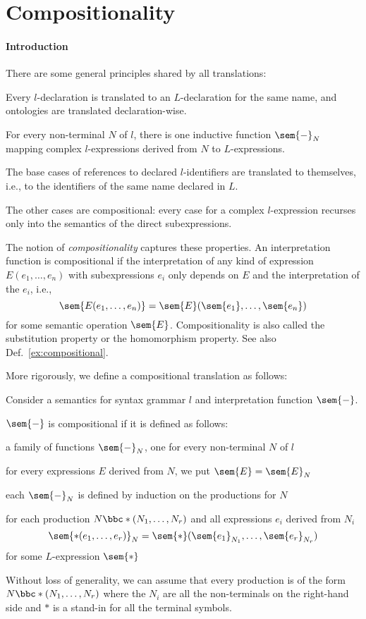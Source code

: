 \section{Compositionality}

\paragraph{Introduction}
There are some general principles shared by all translations:
\begin{compactitem}
 \item Every $l$-declaration is translated to an $L$-declaration for the same name, and ontologies are translated declaration-wise.
 \item For every non-terminal $N$ of $l$, there is one inductive function $\sem{-}_N$ mapping complex $l$-expressions derived from $N$ to $L$-expressions.
 \item The base cases of references to declared $l$-identifiers are translated to themselves, i.e., to the identifiers of the same name declared in $L$.
 \item The other cases are compositional: every case for a complex $l$-expression recurses only into the semantics of the direct subexpressions.
\end{compactitem}

The notion of \emph{compositionality} captures these properties.
An interpretation function is compositional if the interpretation of any kind of expression $E(e_1,\ldots,e_n)$ with subexpressions $e_i$ only depends on $E$ and the interpretation of the $e_i$, i.e., \[\sem{E(e_1,\ldots,e_n)}=\sem{E}(\sem{e_1},\ldots,\sem{e_n})\] for some semantic operation $\sem{E}$.
Compositionality is also called the substitution property or the homomorphism property.
See also Def.~\ref{ex:compositional}.

More rigorously, we define a compositional translation as follows:
\begin{definition}
Consider a semantics for syntax grammar $l$ and interpretation function $\sem{-}$.

$\sem{-}$ is compositional if it is defined as follows:
\begin{compactitem}
 \item a family of functions $\sem{-}_N$, one for every non-terminal $N$ of $l$
 \item for every expressions $E$ derived from $N$, we put $\sem{E}=\sem{E}_N$
 \item each $\sem{-}_N$ is defined by induction on the productions for $N$
 \item for each production $N\bbc *(N_1,\ldots,N_r)$ and all expressions $e_i$ derived from $N_i$
   \[\sem{*(e_1,\ldots,e_r)}_N=\sem{*}(\sem{e_1}_{N_1},\ldots,\sem{e_r}_{N_r})\]
   for some $L$-expression $\sem{*}$
\end{compactitem}

Without loss of generality, we can assume that every production is of the form $N\bbc *(N_1,\ldots,N_r)$ where the $N_i$ are all the non-terminals on the right-hand side and $*$ is a stand-in for all the terminal symbols.
\end{definition}


